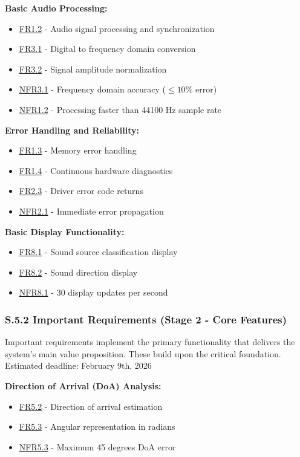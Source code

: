 \documentclass[12pt]{article}
\theoremstyle{definition}
\begin{document}
\textbf{Basic Audio Processing:}
\begin{itemize}
    \item \hyperref[FR1_2]{FR1.2} - Audio signal processing and synchronization
    \item \hyperref[FR3_1]{FR3.1} - Digital to frequency domain conversion
    \item \hyperref[FR3_2]{FR3.2} - Signal amplitude normalization
    \item \hyperref[NFR3_1]{NFR3.1} - Frequency domain accuracy ($\le 10\%$
    error)
    \item \hyperref[NFR1_2]{NFR1.2} - Processing faster than 44100 Hz sample
    rate
\end{itemize}

\textbf{Error Handling and Reliability:}
\begin{itemize}
    \item \hyperref[FR1_3]{FR1.3} - Memory error handling
    \item \hyperref[FR1_4]{FR1.4} - Continuous hardware diagnostics
    \item \hyperref[FR2_3]{FR2.3} - Driver error code returns
    \item \hyperref[NFR2_1]{NFR2.1} - Immediate error propagation
\end{itemize}

\textbf{Basic Display Functionality:}
\begin{itemize}
    \item \hyperref[FR8_1]{FR8.1} - Sound source classification display
    \item \hyperref[FR8_2]{FR8.2} - Sound direction display
    \item \hyperref[NFR8_1]{NFR8.1} - 30 display updates per second
\end{itemize}

\subsubsection{S.5.2 Important Requirements (Stage 2 - Core Features)}

Important requirements implement the primary functionality that delivers the
system's main value proposition. These build upon the critical foundation. \\
\newline
Estimated deadline: February 9th, 2026 \\
\newline

\textbf{Direction of Arrival (DoA) Analysis:}
\begin{itemize}
    \item \hyperref[FR5_2]{FR5.2} - Direction of arrival estimation
    \item \hyperref[FR5_3]{FR5.3} - Angular representation in radians
    \item \hyperref[NFR5_3]{NFR5.3} - Maximum 45 degrees DoA error
\end{itemize}
\end{document}
